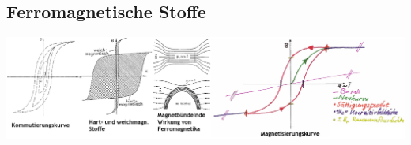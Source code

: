 \begin{landscape}
\subsection{Ferromagnetische Stoffe} \label{ferromagnetische_stoffe}
\includegraphics[width=25cm]{./pics/magnetisierung.png}

\end{landscape}